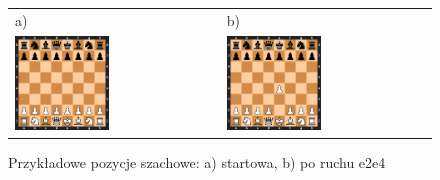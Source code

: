 \begin{figure}[htb]
    \centering
    \begin{tabular}{@{}ll@{}}
        a) & b) \\
        \includegraphics[width=0.475\textwidth]{rozdzialy/rozdzial01/1_komunikacja-z-systemem/rysunki/pozycja_startowa}
        &
        \includegraphics[width=0.475\textwidth]{rozdzialy/rozdzial01/1_komunikacja-z-systemem/rysunki/pozycja_startowa_e2e4}
    \end{tabular}
    \caption{Przykładowe pozycje szachowe: a) startowa, b) po ruchu e2e4}
    \label{fig: figure}
\end{figure}

